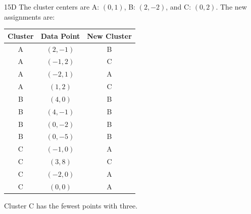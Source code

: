 \begin{solution}{15}{D}
The cluster centers are A: $(0, 1)$, B: $(2, -2)$, and C: $(0, 2)$. The new assignments are:
\begin{center}
\begin{tabular}{|c|c|c|}
\hline
Cluster & Data Point & New Cluster \\ \hline
A & $(2, -1)$ & B \\ \hline
A & $(-1, 2)$ & C \\ \hline
A & $(-2, 1)$ & A \\ \hline
A & $(1, 2)$ & C \\ \hline
B & $(4, 0)$ & B \\ \hline
B & $(4, -1)$ & B \\ \hline
B & $(0, -2)$ & B \\ \hline
B & $(0, -5)$ & B \\ \hline
C & $(-1, 0)$ & A \\ \hline
C & $(3, 8)$ & C \\ \hline
C & $(-2, 0)$ & A \\ \hline
C & $(0, 0)$ & A \\ \hline
\end{tabular}
\end{center}

Cluster C has the fewest points with three.
\end{solution}

